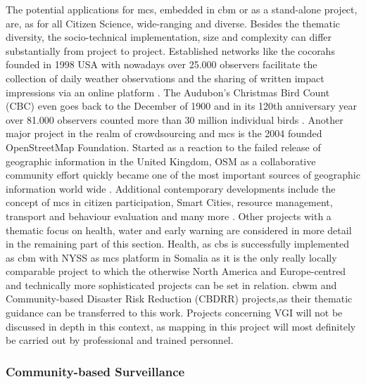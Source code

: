 The potential applications for \acrshort{mcs}, embedded in \acrshort{cbm} or as a stand-alone project, are, as for all Citizen Science, wide-ranging and diverse. Besides the thematic diversity, the socio-technical implementation, size and complexity can differ substantially from project to project. Established networks like the \acrfull{cocorahs} founded in 1998 USA with nowadays over 25.000 observers facilitate the collection of daily weather observations and the sharing of written impact impressions via an online platform \autocite{cocorahsCoCoRaHSCommunityCollaborative2023,lackstromBackyardHydroclimatologyCitizen2022}. The Audubon's Christmas Bird Count (CBC) even goes back to the December of 1900 and in its 120th anniversary year over 81.000 observers counted more than 30 million individual birds \autocite{lebaron122ndChristmasBird2022}. Another major project in the realm of crowdsourcing and \acrshort{mcs} is the 2004 founded OpenStreetMap Foundation. Started as a reaction to the failed release of geographic information in the United Kingdom, OSM as a collaborative community effort quickly became one of the most important sources of geographic information world wide \autocite{bennettOpenStreetMap2010, openstreetmapcontributorsOpenStreetMap}. Additional contemporary developments include the concept of \acrshort{mcs} in citizen participation, Smart Cities, resource management, transport and behaviour evaluation and many more \autocite{dipasDIPASOrgDIPAS2023,europeancommissionCitizencentredApproachSmart2021, wangSurveyApplicationKey2022}. Other projects with a thematic focus on health, water and early warning are considered in more detail in the remaining part of this section.\newline
Health, as \acrfull{cbs} is successfully implemented as \acrshort{cbm} with NYSS as \acrshort{mcs} platform in Somalia as it is the only really locally comparable project to which the otherwise North America and Europe-centred and technically more sophisticated projects can be set in relation. \acrfull{cbwm} and Community-based Disaster Risk Reduction (CBDRR) projects,as their thematic guidance can be transferred to this work. Projects concerning VGI will not be discussed in depth in this context, as mapping in this project will most definitely be carried out by professional and trained personnel.

\subsubsection*{Community-based Surveillance}\label{subsubsec:cbs}

